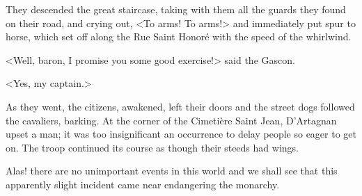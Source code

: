 They descended the great staircase, taking with them all the guards they found on their road, and crying out, <To arms! To arms!> and immediately put spur to horse, which set off along the Rue Saint Honoré with the speed of the whirlwind.

<Well, baron, I promise you some good exercise!> said the Gascon.

<Yes, my captain.>

As they went, the citizens, awakened, left their doors and the street dogs followed the cavaliers, barking. At the corner of the Cimetière Saint Jean, D'Artagnan upset a man; it was too insignificant an occurrence to delay people so eager to get on. The troop continued its course as though their steeds had wings.

Alas! there are no unimportant events in this world and we shall see that this apparently slight incident came near endangering the monarchy. 